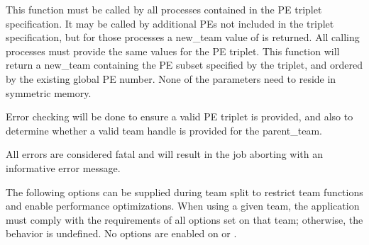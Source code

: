 \begin{apidefinition}
{This function must be called by all processes contained in the \ac{PE} triplet
specification. It may be called by additional \acp{PE} not included in the
triplet specification, but for those processes a new\_team value of
 is returned. All calling processes must provide the
same values for the \ac{PE} triplet. This function will return a new\_team
containing the \ac{PE} subset specified by the triplet, and ordered by the
existing global \ac{PE} number. None of the parameters need to reside in
symmetric memory.

Error checking will be done to ensure a valid \ac{PE} triplet is provided,
and also to determine whether a valid team handle is provided for the
parent\_team.

All errors are considered fatal and will result in the job aborting with
an informative error message.

The following options can be supplied during team split to restrict
team functions and enable performance optimizations.  When using a given
team, the application must comply with the requirements of all options
set on that team; otherwise, the behavior is undefined.
No options are enabled on  or .

}



\begin{apiexamples}

\end{apiexamples}

\end{apidefinition}
